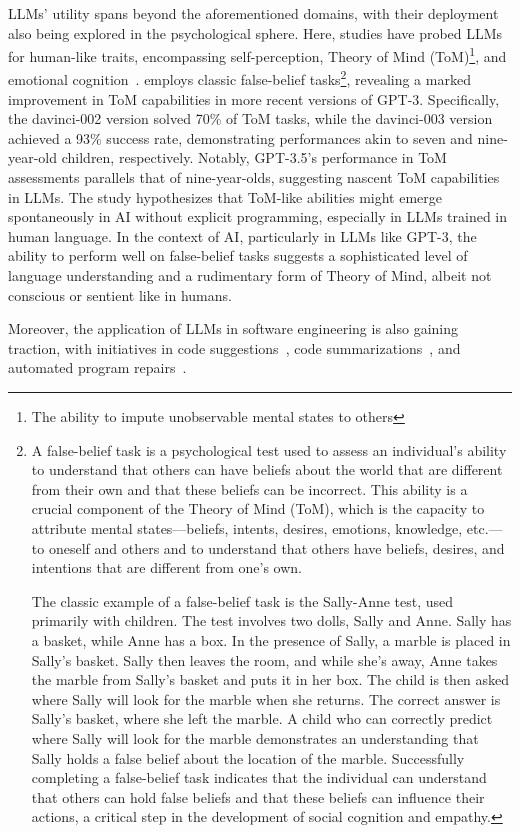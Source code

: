 LLMs' utility spans beyond the aforementioned domains, with their deployment also being explored in the psychological sphere.
Here, studies have probed LLMs for human-like traits, encompassing self-perception, Theory of Mind (ToM)\footnote{The ability to impute unobservable mental states to others}, and emotional cognition~\cite{kosinski2023theoryofmind, amin2023affectivecomputing}.
\textcite{kosinski2023theoryofmind} employs classic false-belief tasks\footnote{A false-belief task is a psychological test used to assess an individual's ability to understand that others can have beliefs about the world that are different from their own and that these beliefs can be incorrect. This ability is a crucial component of the Theory of Mind (ToM), which is the capacity to attribute mental states—beliefs, intents, desires, emotions, knowledge, etc.—to oneself and others and to understand that others have beliefs, desires, and intentions that are different from one's own.

	The classic example of a false-belief task is the Sally-Anne test, used primarily with children. The test involves two dolls, Sally and Anne. Sally has a basket, while Anne has a box. In the presence of Sally, a marble is placed in Sally's basket. Sally then leaves the room, and while she's away, Anne takes the marble from Sally's basket and puts it in her box. The child is then asked where Sally will look for the marble when she returns. The correct answer is Sally's basket, where she left the marble. A child who can correctly predict where Sally will look for the marble demonstrates an understanding that Sally holds a false belief about the location of the marble.
	Successfully completing a false-belief task indicates that the individual can understand that others can hold false beliefs and that these beliefs can influence their actions, a critical step in the development of social cognition and empathy.}, revealing a marked improvement in ToM capabilities in more recent versions of GPT-3.
Specifically, the davinci-002 version solved 70\% of ToM tasks, while the davinci-003 version achieved a 93\% success rate, demonstrating performances akin to seven and nine-year-old children, respectively.
Notably, GPT-3.5's performance in ToM assessments parallels that of nine-year-olds, suggesting nascent ToM capabilities in LLMs.
The study hypothesizes that ToM-like abilities might emerge spontaneously in AI without explicit programming, especially in LLMs trained in human language.
In the context of AI, particularly in LLMs like GPT-3, the ability to perform well on false-belief tasks suggests a sophisticated level of language understanding and a rudimentary form of Theory of Mind, albeit not conscious or sentient like in humans.

Moreover, the application of LLMs in software engineering is also gaining traction, with initiatives in code suggestions~\cite{sridhara2023chatgptsoftware}, code summarizations~\cite{sun2023code}, and automated program repairs~\cite{xia2023conversationalrepair}.